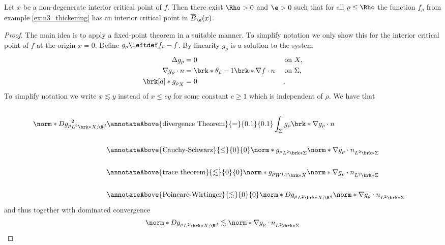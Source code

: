 \begin{proposition}\label{pr:n3_thickening_cp}
  Let $x$ be a non-degenerate interior critical point of $f$.
  Then there exist $\Rho>0$ and $\e>0$ such that for all $\rho\leq\Rho$ the function $f_\rho$ from example
  \ref{ex:n3_thickening} has an interior critical point in $\overline{B}_\e(x)$.
\end{proposition}
\begin{proof}
  The main idea is to apply a fixed-point theorem in a suitable manner.
  To simplify notation we only show this for the interior critical point of $f$ at the origin $x=0$.
  Define $g_\rho\leftdef f_\rho-f$.
  By linearity $g_\rho$ is a solution to the system
  \begin{align*}
    \Delta g_\rho&=0 &&\text{ on }X, \\
    \nabla g_\rho\cdot n&=\brk*{\theta_\rho-1}\brk*{\nabla f\cdot n} &&\text{ on }\Sigma, \\
    \brk[a]*{g_\rho}_X&=0 &&\,.
  \end{align*}
  To simplify notation we write $x\lesssim y$ instead of $x\leq cy$ for
  some constant $c\geq1$ which is independent of $\rho$.
  We have that
  \begin{align*}
    \\
    \norm*{Dg_\rho}_{L^2\brk*{X;\R^d}}^2
    &\annotateAbove{\text{divergence Theorem}}{=}{0.1}{0.1} \int_{\Sigma}g_\rho\brk*{\nabla g_\rho\cdot n} \\ \\
    &\annotateAbove{\text{Cauchy-Schwarz}}{\leq}{0}{0} \norm*{g_\rho}_{L^2\brk*{\Sigma}}\norm*{\nabla g_\rho\cdot n}_{L^2\brk*{\Sigma}} \\ \\
    &\annotateAbove{\text{trace theorem}}{\lesssim}{0}{0} \norm*{g_\rho}_{W^{1,2}\brk*{X}}\norm*{\nabla g_\rho\cdot n}_{L^2\brk*{\Sigma}} \\ \\
    &\annotateAbove{\text{Poincaré-Wirtinger}}{\lesssim}{0}{0} \norm*{Dg_\rho}_{L^2\brk*{X;\R^d}}\norm*{\nabla g_\rho\cdot n}_{L^2\brk*{\Sigma}}
  \end{align*}
  and thus together with dominated convergence
  \begin{align*}
    \norm*{Dg_\rho}_{L^2\brk*{X;\R^d}}\lesssim\norm*{\nabla g_\rho\cdot n}_{L^2\brk*{\Sigma}}

\end{align*}
\end{proof}
